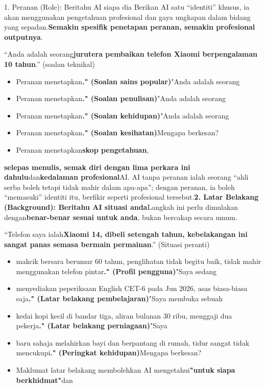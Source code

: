 \begin{tcbinfo}{1. Peranan (Role): Beritahu AI siapa dia}
Berikan AI satu “identiti” khusus, ia akan menggunakan pengetahuan profesional dan gaya ungkapan dalam bidang yang sepadan.\textbf{Semakin spesifik penetapan peranan, semakin profesional outputnya}.

\end{tcbinfo}


“Anda adalah seorang\textbf{jurutera pembaikan telefon Xiaomi berpengalaman 10 tahun}.” (soalan teknikal)


\begin{itemize}
  \item Peranan menetapkan\textbf{." (Soalan sains popular)}"Anda adalah seorang
  \item Peranan menetapkan\textbf{." (Soalan penulisan)}"Anda adalah seorang
  \item Peranan menetapkan\textbf{." (Soalan kehidupan)}"Anda adalah seorang
  \item Peranan menetapkan\textbf{." (Soalan kesihatan)}Mengapa berkesan?
  \item Peranan menetapkan\textbf{skop pengetahuan},
\end{itemize}

\textbf{selepas menulis, semak diri dengan lima perkara ini dahulu}dan\textbf{kedalaman profesional}AI. AI tanpa peranan ialah seorang “ahli serba boleh tetapi tidak mahir dalam apa-apa”; dengan peranan, ia boleh “memasuki” identiti itu, berfikir seperti profesional tersebut.\textbf{2. Latar Belakang (Background): Beritahu AI situasi anda}Langkah ini perlu dimulakan dengan\textbf{benar-benar sesuai untuk anda}, bukan bercakap secara umum.


“Telefon saya ialah\textbf{Xiaomi 14, dibeli setengah tahun, kebelakangan ini sangat panas semasa bermain permainan}.” (Situasi peranti)


\begin{itemize}
  \item makcik bersara berumur 60 tahun, penglihatan tidak begitu baik, tidak mahir menggunakan telefon pintar\textbf{." (Profil pengguna)}"Saya sedang
  \item menyediakan peperiksaan English CET-6 pada Jun 2026, asas biasa-biasa saja\textbf{." (Latar belakang pembelajaran)}"Saya membuka sebuah
  \item kedai kopi kecil di bandar tiga, aliran bulanan 30 ribu, menggaji dua pekerja\textbf{." (Latar belakang perniagaan)}"Saya
  \item baru sahaja melahirkan bayi dan berpantang di rumah, tidur sangat tidak mencukupi\textbf{." (Peringkat kehidupan)}Mengapa berkesan?
  \item Maklumat latar belakang membolehkan AI mengetahui\textbf{"untuk siapa berkhidmat"}dan
\end{itemize}


